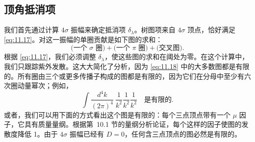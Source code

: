 \subsection{顶角抵消项}

我们首先通过计算 $4\sigma$ 振幅来确定抵消项 $\delta_\lambda$。树图项来自 $4\sigma$ 顶点，恰好满足 \eqref{eq:11.17}。对这一振幅的单圈贡献是如下图的求和：
\begin{equation}
  \text{(一个 $\sigma$ 圈)} + \text{(一个 $\pi$ 圈)} + \text{(交叉图)} .
  \label{eq:11.18}
\end{equation}
根据 \eqref{eq:11.17}，我们必须调整 $\delta_\lambda$，使这些图的求和在阈处为零。在这个计算中，我们只跟踪紫外发散。这大大简化了分析，因为 \eqref{eq:11.18} 中的大多数图都是有限的。所有圈由三个或更多传播子构成的图都是有限的，因为它们在分母中至少有六次圈动量幂次；例如，
\begin{equation}
  \int \frac{d^4k}{(2\pi)^4}\ \frac{1}{k^2}\frac{1}{k^2}\frac{1}{k^2}
  \quad \text{是有限的} .
\end{equation}
或者，我们可以用下面的方式看出这个图是有限的：每个三点顶点带有一个 $\mu$ 因子，它具有质量量纲。根据第~10.1 节的量纲分析论证，每个这样的因子使图的发散度降低 1。由于 $4\sigma$ 振幅已经有 $D = 0$，任何含三点顶点的图必然是有限的。


